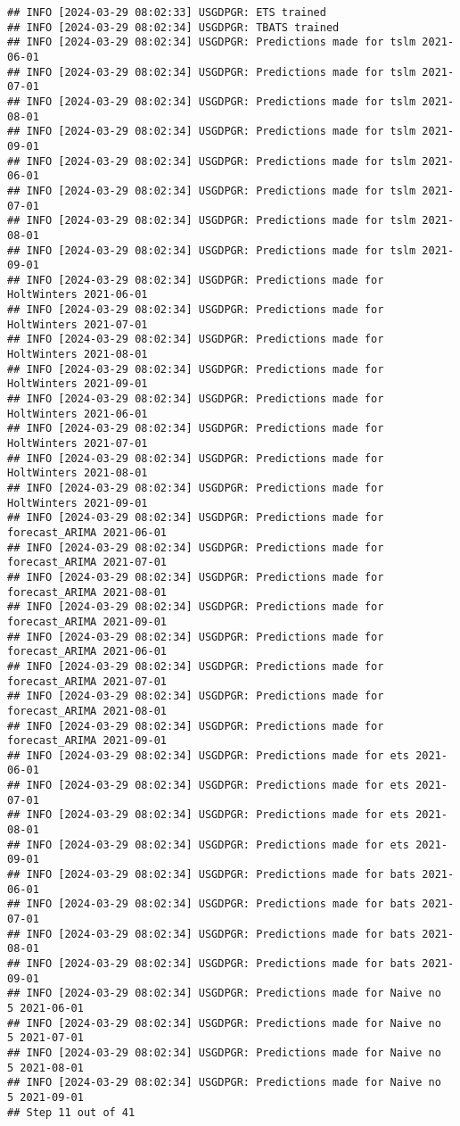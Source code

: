 \documentclass[
]{article}
\begin{document}
\begin{verbatim}
## INFO [2024-03-29 08:02:33] USGDPGR: ETS trained
## INFO [2024-03-29 08:02:34] USGDPGR: TBATS trained
## INFO [2024-03-29 08:02:34] USGDPGR: Predictions made for tslm 2021-06-01
## INFO [2024-03-29 08:02:34] USGDPGR: Predictions made for tslm 2021-07-01
## INFO [2024-03-29 08:02:34] USGDPGR: Predictions made for tslm 2021-08-01
## INFO [2024-03-29 08:02:34] USGDPGR: Predictions made for tslm 2021-09-01
## INFO [2024-03-29 08:02:34] USGDPGR: Predictions made for tslm 2021-06-01
## INFO [2024-03-29 08:02:34] USGDPGR: Predictions made for tslm 2021-07-01
## INFO [2024-03-29 08:02:34] USGDPGR: Predictions made for tslm 2021-08-01
## INFO [2024-03-29 08:02:34] USGDPGR: Predictions made for tslm 2021-09-01
## INFO [2024-03-29 08:02:34] USGDPGR: Predictions made for HoltWinters 2021-06-01
## INFO [2024-03-29 08:02:34] USGDPGR: Predictions made for HoltWinters 2021-07-01
## INFO [2024-03-29 08:02:34] USGDPGR: Predictions made for HoltWinters 2021-08-01
## INFO [2024-03-29 08:02:34] USGDPGR: Predictions made for HoltWinters 2021-09-01
## INFO [2024-03-29 08:02:34] USGDPGR: Predictions made for HoltWinters 2021-06-01
## INFO [2024-03-29 08:02:34] USGDPGR: Predictions made for HoltWinters 2021-07-01
## INFO [2024-03-29 08:02:34] USGDPGR: Predictions made for HoltWinters 2021-08-01
## INFO [2024-03-29 08:02:34] USGDPGR: Predictions made for HoltWinters 2021-09-01
## INFO [2024-03-29 08:02:34] USGDPGR: Predictions made for forecast_ARIMA 2021-06-01
## INFO [2024-03-29 08:02:34] USGDPGR: Predictions made for forecast_ARIMA 2021-07-01
## INFO [2024-03-29 08:02:34] USGDPGR: Predictions made for forecast_ARIMA 2021-08-01
## INFO [2024-03-29 08:02:34] USGDPGR: Predictions made for forecast_ARIMA 2021-09-01
## INFO [2024-03-29 08:02:34] USGDPGR: Predictions made for forecast_ARIMA 2021-06-01
## INFO [2024-03-29 08:02:34] USGDPGR: Predictions made for forecast_ARIMA 2021-07-01
## INFO [2024-03-29 08:02:34] USGDPGR: Predictions made for forecast_ARIMA 2021-08-01
## INFO [2024-03-29 08:02:34] USGDPGR: Predictions made for forecast_ARIMA 2021-09-01
## INFO [2024-03-29 08:02:34] USGDPGR: Predictions made for ets 2021-06-01
## INFO [2024-03-29 08:02:34] USGDPGR: Predictions made for ets 2021-07-01
## INFO [2024-03-29 08:02:34] USGDPGR: Predictions made for ets 2021-08-01
## INFO [2024-03-29 08:02:34] USGDPGR: Predictions made for ets 2021-09-01
## INFO [2024-03-29 08:02:34] USGDPGR: Predictions made for bats 2021-06-01
## INFO [2024-03-29 08:02:34] USGDPGR: Predictions made for bats 2021-07-01
## INFO [2024-03-29 08:02:34] USGDPGR: Predictions made for bats 2021-08-01
## INFO [2024-03-29 08:02:34] USGDPGR: Predictions made for bats 2021-09-01
## INFO [2024-03-29 08:02:34] USGDPGR: Predictions made for Naive no  5 2021-06-01
## INFO [2024-03-29 08:02:34] USGDPGR: Predictions made for Naive no  5 2021-07-01
## INFO [2024-03-29 08:02:34] USGDPGR: Predictions made for Naive no  5 2021-08-01
## INFO [2024-03-29 08:02:34] USGDPGR: Predictions made for Naive no  5 2021-09-01
## Step 11 out of 41
\end{verbatim}
\end{document}
